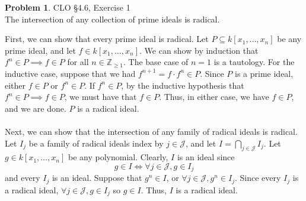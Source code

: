 \documentclass[12pt]{amsart}
\theoremstyle{definition}
\newtheorem{prob}{Problem}
\begin{document}
\begin{flushleft}
\begin{prob}  CLO \S4.6, Exercise 1 \smallskip \\
The intersection of any collection of prime ideals is radical.
\end{prob}
First, we can show that every prime ideal is radical. Let $P \subseteq k[x_1,\dots,x_n]$ be any prime ideal, and let $f \in k[x_1,\dots,x_n]$. We can show by induction that $f^n \in P \implies f \in P$ for all $n \in \mathbb Z_{\ge 1}$. The base case of $n=1$ is a tautology. For the inductive case, suppose that we had $f^{n+1} = f\cdot f^n \in P$. Since $P$ is a prime ideal, either $f \in P$ or $f^n \in P$. If $f^n \in P$, by the inductive hypothesis that $f^n \in P \implies f\in P$, we must have that $f \in P$. Thus, in either case, we have $f \in P$, and we are done. $P$ is a radical ideal.
\\ \ \\
Next, we can show that the intersection of any family of radical ideals is radical. Let $I_j$ be a family of radical ideals index by $j \in \mathcal J$, and let $I = \bigcap_{j \in \mathcal J} I_j$. Let $g \in k[x_1,\dots,x_n]$ be any polynomial. Clearly, $I$ is an ideal since \[g \in I \iff \forall j \in \mathcal J, g \in I_j\]
and every $I_j$ is an ideal. Suppose that $g^n \in I$, or $\forall j \in \mathcal J, g^n \in I_j$. Since every $I_j$ is a radical ideal, $\forall j \in \mathcal J, g \in I_j$ so $g \in I$. Thus, $I$ is a radical ideal.


\end{flushleft}
\end{document}
